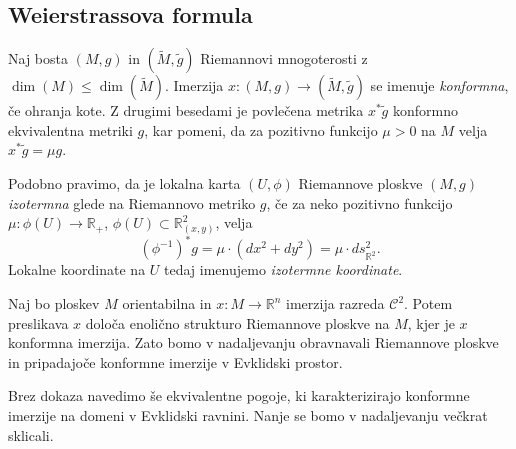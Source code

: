 \documentclass[12pt,a4paper,twoside]{article}
\theoremstyle{definition} %
\theoremstyle{plain} %
\numberwithin{equation}{section}  %
\newcommand{\R}{\mathbb R}
\begin{document}
\subsection{Weierstrassova formula}
%
Naj bosta $(M,g)$ in $(\widetilde{M},\tilde{g})$ Riemannovi mnogoterosti z $\dim(M) \leq \dim(\widetilde{M})$.
Imerzija $x \colon (M,g) \to (\widetilde{M}, \tilde{g})$ se imenuje \emph{konformna}, če ohranja kote.
Z drugimi besedami je povlečena metrika $x^{*}\tilde{g}$ konformno ekvivalentna metriki $g$, kar pomeni, da za pozitivno funkcijo $\mu > 0$ na $M$ velja $x^{*}\tilde{g} = \mu g$.

Podobno pravimo, da je lokalna karta $(U, \phi)$ Riemannove ploskve $(M,g)$ \emph{izotermna} glede na Riemannovo metriko $g$, če za neko pozitivno funkcijo $\mu \colon \phi(U) \to \mathbb{R}_{+}$, $\phi(U) \subset \mathbb{R}_{(x,y)}^2$, velja
\begin{equation}
(\phi^{-1})^{*}g = \mu \cdot (dx^2+dy^2) = \mu \cdot ds_{\mathbb{R}^2}^2.
\end{equation} 
Lokalne koordinate na $U$ tedaj imenujemo \emph{izotermne koordinate}.

Naj bo ploskev $M$ orientabilna in $x \colon M \to \R^{n}$ imerzija razreda $\mathcal{C}^2$. Potem preslikava $x$ določa enolično strukturo Riemannove ploskve na $M$, kjer je $x$ konformna imerzija. Zato bomo v nadaljevanju obravnavali Riemannove ploskve in pripadajoče konformne imerzije v Evklidski prostor.

Brez dokaza navedimo še ekvivalentne pogoje, ki karakterizirajo konformne imerzije na domeni v Evklidski ravnini. Nanje se bomo v nadaljevanju večkrat sklicali.
\end{document}
